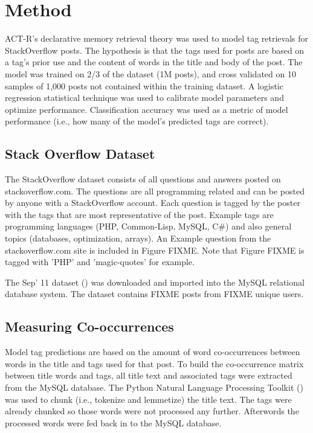 \documentclass[10pt,letterpaper]{article}
\begin{document}
\section{Method}

ACT-R's declarative memory retrieval theory was used to model tag retrievals for StackOverflow posts.
The hypothesis is that the tags used for posts are based on a tag's prior use and the content of words in the title and body of the post.
The model was trained on 2/3 of the dataset (1M posts), and cross validated on 10 samples of 1,000 posts not contained within the training dataset.
A logistic regression statistical technique was used to calibrate model parameters and optimize performance.
Classification accuracy was used as a metric of model performance (i.e., how many of the model's predicted tags are correct).

\subsection{Stack Overflow Dataset}

The StackOverflow dataset consists of all questions and answers posted on stackoverflow.com.
The questions are all programming related and can be posted by anyone with a StackOverflow account.
Each question is tagged by the poster with the tags that are most representative of the post.
Example tags are programming languages (PHP, Common-Lisp, MySQL, C\#) and also general topics (databases, optimization, arrays).
An Example question from the stackoverflow.com site is included in Figure FIXME.
Note that Figure FIXME is tagged with 'PHP' and 'magic-quotes' for example.

The Sep' 11 dataset (\cite{DataDump2011}) was downloaded and imported into the MySQL relational database system.
The dataset contains FIXME posts from FIXME unique users.

\subsection{Measuring Co-occurrences}

Model tag predictions are based on the amount of word co-occurrences between words in the title and tags used for that post.
To build the co-occurrence matrix between title words and tags, all title text and associated tags were extracted from the MySQL database.
The Python Natural Language Processing Toolkit (\cite{Bird2009}) was used to chunk (i.e., tokenize and lemmetize) the title text.
The tags were already chunked so those words were not processed any further.
Afterwords the processed words were fed back in to the MySQL database.
\end{document}
